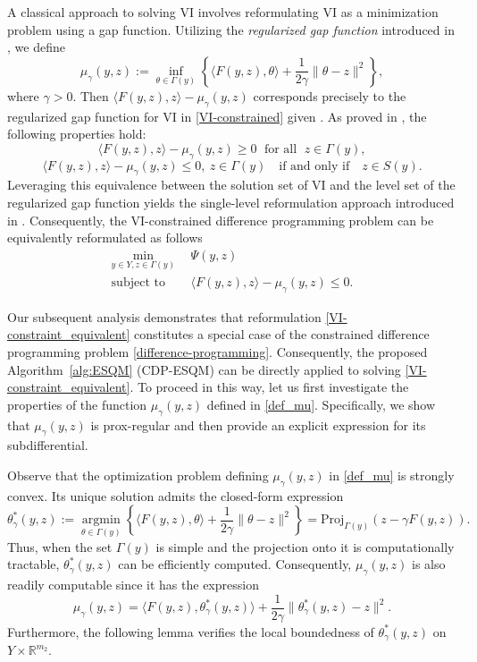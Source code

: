 \documentclass[11pt,a4paper]{article}
\theoremstyle{plain}
\begin{document}
A classical approach to solving VI involves reformulating VI as a minimization problem using a gap function. Utilizing the {\em regularized gap function} introduced in \cite{fukushima1992equivalent}, we define
\begin{equation}\label{def_mu}
\mu_\gamma(y,z)	:= \inf\limits_{\theta\in \Gamma(y)}\left\{
\langle F(y,z),\theta\rangle+\frac{1}{2\gamma}\|\theta-z\|^2
\right\},
\end{equation}
where $\gamma >0$. Then $\langle F(y,z),z\rangle - \mu_\gamma(y,z)$ corresponds precisely to the regularized gap function for VI in \eqref{VI-constrained} given \cite{fukushima1992equivalent}. As proved in 
\cite[Theorem~3.1]{fukushima1992equivalent}, the following properties hold:
$$\langle F(y,z),z\rangle - \mu_\gamma(y,z) \ge 0\;\mbox{ for all }\;z \in \Gamma(y),$$ 
$$\langle F(y,z),z\rangle - \mu_\gamma(y,z) \le 0, ~z \in \Gamma(y) \quad \text{if and only if} \quad z \in S(y).$$ Leveraging this equivalence between the solution set of VI and the level set of the regularized gap function yields the single-level reformulation approach introduced in \cite{marcotte1996exact}. Consequently, the VI-constrained difference programming problem can be equivalently reformulated as follows
\begin{equation}\label{VI-constraint_equivalent}
\begin{aligned}
\min_{ y \in Y, z\in \Gamma(y)}  ~~& 
\Psi(y,z)\\
\text{subject to } ~~~~& \langle F(y,z),z\rangle - \mu_\gamma(y,z) \le 0.
\end{aligned}
\end{equation}


Our subsequent analysis demonstrates that reformulation \eqref{VI-constraint_equivalent} constitutes a special case of the constrained difference programming problem \eqref{difference-programming}. Consequently, the proposed 
Algorithm~\ref{alg:ESQM} (CDP-ESQM) can be directly applied to solving \eqref{VI-constraint_equivalent}. To proceed in this way, let us first investigate the properties of the function $\mu_\gamma(y,z)$ defined in \eqref{def_mu}. Specifically, we show that $\mu_\gamma(y,z)$ is prox-regular and then provide an explicit expression for its subdifferential.

Observe that the optimization problem defining $\mu_\gamma(y,z)$ in \eqref{def_mu} is strongly convex.  Its unique solution admits the closed-form expression
\begin{equation}\label{def_theta}
\theta_\gamma^*(y, z) :=  \mathop{\arg\min}\limits_{\theta \in \Gamma(y)} \left\{
\langle F(y,z), \theta \rangle + \frac{1}{2\gamma} \|\theta - z\|^2
\right\} = \mathrm{Proj}_{\Gamma(y)}\left(z - \gamma F(y,z)\right).
\end{equation}
Thus, when  the set $\Gamma(y)$ is simple and the projection onto it is computationally tractable, $\theta_\gamma^*(y, z)$ can be efficiently computed. Consequently, $\mu_\gamma(y,z)$ is also readily computable since it has the expression $$\mu_\gamma(y,z) = \langle F(y,z), \theta_\gamma^*(y, z)  \rangle + \frac{1}{2\gamma} \|\theta_\gamma^*(y, z)  - z\|^2.$$ Furthermore, the following lemma verifies the local boundedness of $\theta_\gamma^*(y, z)$ on $Y \times \mathbb{R}^{m_2}$.
\end{document}
